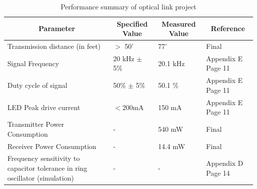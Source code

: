 \documentclass{article}
\begin{document}
\begin{table}[H]
	\centering
	\caption{Performance summary of optical link project}
	\label{tab:opticallink}
	\begin{tabular}{|l|l|l|l|}
		\hline
		\multicolumn{1}{|c|}{\textbf{Parameter}}                                     & \multicolumn{1}{c|}{\textbf{Specified Value}} & \multicolumn{1}{c|}{\textbf{Measured Value}} & \multicolumn{1}{c|}{\textbf{Reference}} \\ \hline
		Transmission distance (in feet)                                              & $>$ 50'                                       & 77'                                          &         Final                              \\ \hline
		Signal Frequency                                                             & 20 kHz $\pm$ 5\%                              & 20.1 kHz                                     &    Appendix E Page 11                                     \\ \hline
		Duty cycle of signal                                                         & 50\% $\pm$ 5\%                                & 50.1 \%                                      &     Appendix E Page 11                                    \\ \hline
		LED Peak drive current                                                       & $<$200mA                                      & 150 mA                                       &   Appendix E Page 11                                      \\ \hline
		Transmitter Power Consumption                                                & -                                             &  540 mW                                            &    Final                                     \\ \hline
		Receiver Power Consumption                                                   & -                                             &    14.4 mW                                          &       Final                                  \\ \hline
		Frequency sensitivity to capacitor tolerance in ring oscillator (simulation) & -                                             &              -                                &   Appendix D Page 14                                      \\ \hline
	\end{tabular}
\end{table}
\end{document}
